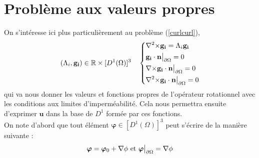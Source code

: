 \section{Problème aux valeurs propres}
\label{eigen}
On s'intéresse ici plus particulièrement au problème (\ref{curlcurl}),
\begin{equation}\label{pbeigen}
(\Lambda_i,\mathbf{g_i})\in{\mathbb{R}}\times [D^1(\Omega)]^3\quad \left\{\begin{aligned}
&{\nabla^2\times}  \mathbf{g_i} = \Lambda_i \mathbf{g_i}\\
&\mathbf{g_i}\cdot \mathbf{n}{\big\rvert_{\partial\Omega}} = 0\\
&{\nabla\times} \mathbf{g_i}\cdot \mathbf{n}{\big\rvert_{\partial\Omega}} = 0\\
&{\nabla^2\times}  \mathbf{g_i}\cdot \mathbf{n}{\big\rvert_{\partial\Omega}} = 0
\end{aligned}\right.
\end{equation}
qui va nous donner les valeurs et fonctions propres de l'opérateur rotationnel avec les conditions aux limites d'imperméabilité. Cela nous permettra ensuite d'exprimer $\bm{u}$ dans la base de $D^1$ formée par ces fonctions.\\

On note d'abord que tout élément $\bm{\varphi}\in [D^1(\Omega)]^3$ peut s'écrire de la manière suivante :
\[ \bm{\varphi} = \bm{\varphi}_0 + {\nabla}\phi\text{ et } \bm{\varphi}{\big\rvert_{\partial\Omega}} = {\nabla}\phi \]

